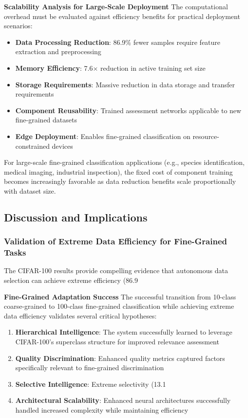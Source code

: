\documentclass[12pt]{article}
\begin{document}
\textbf{Scalability Analysis for Large-Scale Deployment}
The computational overhead must be evaluated against efficiency benefits for practical deployment scenarios:

\begin{itemize}
\item \textbf{Data Processing Reduction}: 86.9\% fewer samples require feature extraction and preprocessing
\item \textbf{Memory Efficiency}: 7.6× reduction in active training set size
\item \textbf{Storage Requirements}: Massive reduction in data storage and transfer requirements
\item \textbf{Component Reusability}: Trained assessment networks applicable to new fine-grained datasets
\item \textbf{Edge Deployment}: Enables fine-grained classification on resource-constrained devices
\end{itemize}

For large-scale fine-grained classification applications (e.g., species identification, medical imaging, industrial inspection), the fixed cost of component training becomes increasingly favorable as data reduction benefits scale proportionally with dataset size.

\subsection{Discussion and Implications}\label{discussion}

\subsubsection{Validation of Extreme Data Efficiency for Fine-Grained Tasks}\label{extreme-efficiency-validation}

The CIFAR-100 results provide compelling evidence that autonomous data selection can achieve extreme efficiency (86.9%

\textbf{Fine-Grained Adaptation Success}
The successful transition from 10-class coarse-grained to 100-class fine-grained classification while achieving extreme data efficiency validates several critical hypotheses:

\begin{enumerate}
\item \textbf{Hierarchical Intelligence}: The system successfully learned to leverage CIFAR-100's superclass structure for improved relevance assessment
\item \textbf{Quality Discrimination}: Enhanced quality metrics captured factors specifically relevant to fine-grained discrimination
\item \textbf{Selective Intelligence}: Extreme selectivity (13.1%
\item \textbf{Architectural Scalability}: Enhanced neural architectures successfully handled increased complexity while maintaining efficiency
\end{enumerate}
\end{document}
